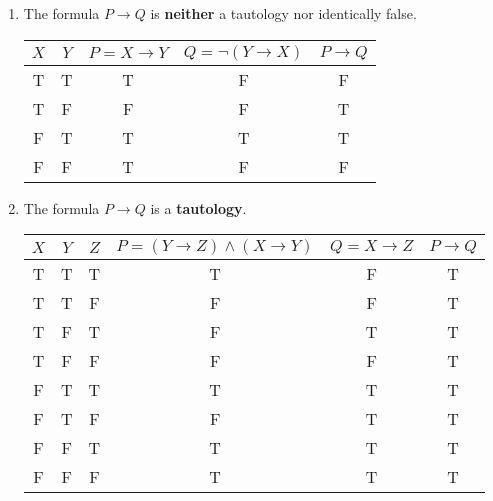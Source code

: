 \documentclass[12pt]{article}
\newcommand{\p}[1]{\item[\textnormal{(#1)}]}
\newenvironment{ps}
{\begin{enumerate}[leftmargin=0em, itemindent=1.5em]}
{\end{enumerate}}
\begin{document}
\begin{ps}
    \p{vii} The formula \(P \rightarrow Q\) is \textbf{neither} a tautology nor
    identically false.

        \begin{center}
        \begin{tabular}{|c|c|c|c|c|}
        \hline
        $X$ & $Y$ & $P = X \rightarrow Y$ & $Q = \neg (Y \rightarrow X)$ & $P \rightarrow Q$ \\
        \hline
        T & T & T & F & F \\
        T & F & F & F & T \\
        F & T & T & T & T \\
        F & F & T & F & F \\
        \hline
        \end{tabular}
        \end{center}

    \p{viii} The formula \(P \rightarrow Q\) is a \textbf{tautology}.

        \begin{center}
        \begin{tabular}{|c|c|c|c|c|c|}
        \hline
        $X$ & $Y$ & $Z$ & $P = (Y \rightarrow Z) \wedge (X \rightarrow Y) $ & $Q = X \rightarrow Z$ & $P \rightarrow Q$ \\
        \hline
        T & T & T & T & F & T \\
        T & T & F & F & F & T \\
        T & F & T & F & T & T \\
        T & F & F & F & F & T \\
        F & T & T & T & T & T \\
        F & T & F & F & T & T \\
        F & F & T & T & T & T \\
        F & F & F & T & T & T \\
        \hline
        \end{tabular}
        \end{center}

\end{ps}
\end{document}
